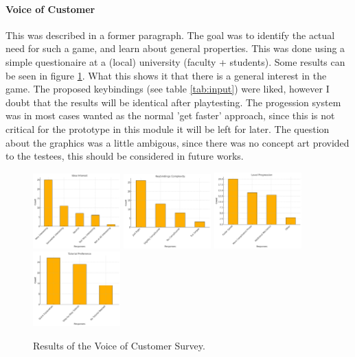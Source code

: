 \documentclass{article}
\begin{document}
\paragraph{Voice of Customer}
This was described in a former paragraph. The goal was to identify the actual need for such a game, and learn about general properties. This was done using a simple questionaire at a (local) university (faculty + students).
Some results can be seen in figure \ref{fig:voc}. What this shows it that there is a general interest in the game. The proposed keybindings (see table \ref{tab:input}) were liked, however I doubt that the results will be identical after playtesting.
The progession system was in most cases wanted as the normal 'get faster' approach, since this is not critical for the prototype in this module it will be left for later.
The question about the graphics was a little ambigous, since there was no concept art provided to the testees, this should be considered in future works.
\begin{figure}
    \centering
    \includegraphics[width=0.3\textwidth]{./Dev/voc1.png}
    \includegraphics[width=0.3\textwidth]{./Dev/voc2.png}
    \includegraphics[width=0.3\textwidth]{./Dev/voc3.png}
    \includegraphics[width=0.3\textwidth]{./Dev/voc4.png}
    \caption{Results of the Voice of Customer Survey.}
    \label{fig:voc}
\end{figure}
\end{document}

